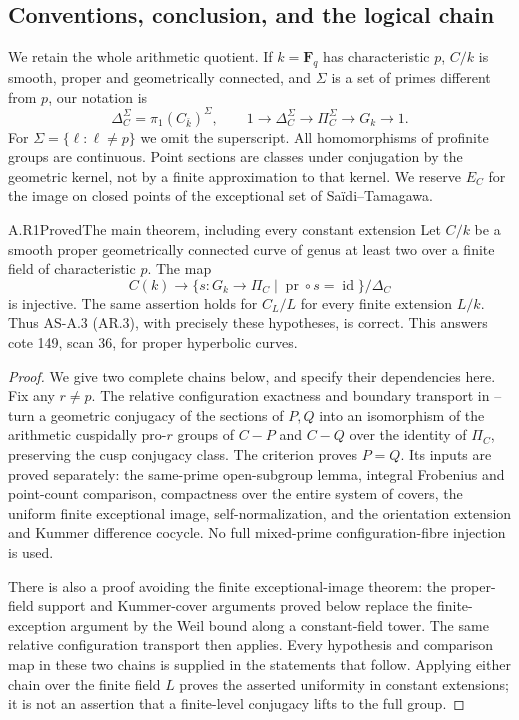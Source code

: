 \subsection{Conventions, conclusion, and the logical chain}
We retain the whole arithmetic quotient. If $k=\mathbf F_q$ has
characteristic $p$, $C/k$ is smooth, proper and geometrically connected,
and $\Sigma$ is a set of primes different from $p$, our notation is
\[
 \Delta_C^\Sigma=\pi_1(C_{\bar k})^\Sigma,\qquad
 1\longrightarrow\Delta_C^\Sigma\longrightarrow
 \Pi_C^\Sigma\longrightarrow G_k\longrightarrow1.
\]
For $\Sigma=\{\ell:\ell\ne p\}$ we omit the superscript. All
homomorphisms of profinite groups are continuous. Point sections are
classes under conjugation by the geometric kernel, not by a finite
approximation to that kernel. We reserve $E_C$ for the image on closed
points of the exceptional set of Sa\"idi--Tamagawa.

\begin{claim}{A.R1}{Proved}{The main theorem, including every constant extension}
Let $C/k$ be a smooth proper geometrically connected curve of genus at
least two over a finite field of characteristic $p$. The map
\[
 C(k)\longrightarrow
 \{s:G_k\to\Pi_C\mid \operatorname{pr}\circ s=\operatorname{id}\}/\Delta_C
\]
is injective. The same assertion holds for $C_L/L$ for every finite
extension $L/k$. Thus AS-A.3 (AR.3), with precisely these hypotheses,
is correct. This answers cote 149, scan 36, for proper hyperbolic curves.
\end{claim}
\begin{proof}
We give two complete chains below, and specify their dependencies here.
Fix any $r\ne p$. The relative configuration exactness and boundary
transport in --
turn a geometric conjugacy of the sections of $P,Q$ into an isomorphism
of the arithmetic cuspidally pro-$r$ groups of $C-P$ and $C-Q$ over the
identity of $\Pi_C$, preserving the cusp conjugacy class. The criterion
 proves $P=Q$. Its inputs are proved separately:
the same-prime open-subgroup lemma, integral Frobenius and point-count
comparison, compactness over the entire system of covers, the uniform
finite exceptional image, self-normalization, and the orientation
extension and Kummer difference cocycle. No full mixed-prime
configuration-fibre injection is used.

There is also a proof avoiding the finite exceptional-image theorem:
the proper-field support and Kummer-cover arguments proved below
replace the finite-exception argument by the Weil bound along a
constant-field tower. The same relative configuration transport then
applies. Every hypothesis and comparison map in these two chains is
supplied in the statements that follow. Applying either chain over the
finite field $L$ proves the asserted uniformity in constant extensions;
it is not an assertion that a finite-level conjugacy lifts to the full group.
\end{proof}

